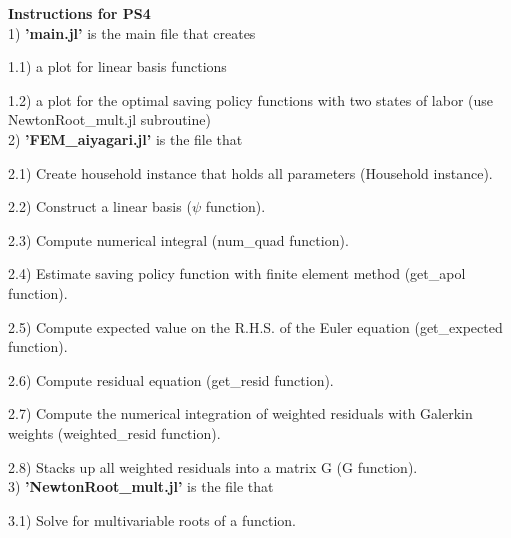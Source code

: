 \documentclass{article}
\begin{document}
	\noindent\textbf{\Large Instructions for PS4} \\
	
	1) \textbf{'main.jl'} is the main file that creates 
	
	\hspace{0.5 cm} 1.1) a plot for linear basis functions 
	
	\hspace{0.5 cm} 1.2) a plot for the optimal saving policy functions with two states of labor (use NewtonRoot\_mult.jl subroutine) \\
	
	2) \textbf{'FEM\_aiyagari.jl'} is the file that 
	
	\hspace{0.5 cm} 2.1) Create household instance that holds all parameters (Household instance).

	\hspace{0.5 cm} 2.2) Construct a linear basis ($\psi$ function).
	
	\hspace{0.5 cm} 2.3) Compute numerical integral (num\_quad function).
	
	\hspace{0.5 cm} 2.4) Estimate saving policy function with finite element method (get\_apol function).
	
	\hspace{0.5 cm} 2.5) Compute expected value on the R.H.S. of the Euler equation (get\_expected function). 
	
	\hspace{0.5 cm} 2.6) Compute residual equation (get\_resid function).
	
	\hspace{0.5 cm} 2.7) Compute the numerical integration of weighted residuals with Galerkin weights (weighted\_resid function).
	
	\hspace{0.5 cm} 2.8) Stacks up all weighted residuals into a matrix G (G function). \\
	
	3) \textbf{'NewtonRoot\_mult.jl'} is the file that 
	
	\hspace{0.5 cm} 3.1) Solve for multivariable roots of a function.
\end{document}
